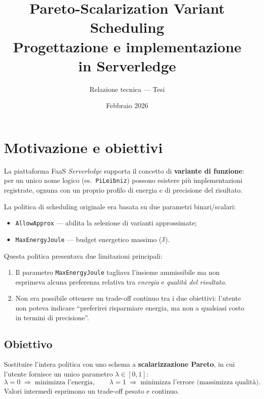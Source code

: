 \documentclass[a4paper,12pt]{article}
\title{\textbf{Pareto-Scalarization Variant Scheduling}\\[6pt]
       \large Progettazione e implementazione in Serverledge}
\author{Relazione tecnica --- Tesi}
\date{Febbraio 2026}
\begin{document}
\maketitle
\tableofcontents
\newpage

\section{Motivazione e obiettivi}

La piattaforma FaaS \emph{Serverledge} supporta il concetto di
\textbf{variante di funzione}: per un unico nome logico (es.\
\texttt{PiLeibniz}) possono esistere più implementazioni registrate,
ognuna con un proprio profilo di energia e di precisione del risultato.

La politica di scheduling originale era basata su due parametri
binari/scalari:
\begin{itemize}
  \item \texttt{AllowApprox} --- abilita la selezione di varianti
        approssimate;
  \item \texttt{MaxEnergyJoule} --- budget energetico massimo (J).
\end{itemize}

Questa politica presentava due limitazioni principali:
\begin{enumerate}
  \item Il parametro \texttt{MaxEnergyJoule} tagliava l'insieme
        ammissibile ma non esprimeva alcuna preferenza relativa tra
        \emph{energia} e \emph{qualità del risultato}.
  \item Non era possibile ottenere un trade-off continuo tra i due
        obiettivi: l'utente non poteva indicare ``preferirei risparmiare
        energia, ma non a qualsiasi costo in termini di precisione''.
\end{enumerate}

\subsection{Obiettivo}

Sostituire l'intera politica con uno schema a
\textbf{scalarizzazione Pareto}, in cui l'utente fornisce un unico
parametro $\lambda \in [0,1]$:
\begin{equation}\label{eq:meaning}
  \lambda = 0 \;\Rightarrow\; \text{minimizza l'energia},
  \qquad
  \lambda = 1 \;\Rightarrow\; \text{minimizza l'errore (massimizza qualità)}.
\end{equation}
Valori intermedi esprimono un trade-off pesato e continuo.
\end{document}

